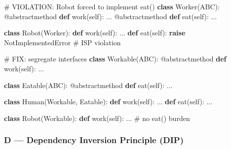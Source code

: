 \documentclass[11pt]{article}
\newenvironment{Shaded}{\begin{snugshade}}{\end{snugshade}}
\newcommand{\AttributeTok}[1]{\textcolor[rgb]{0.16,0.50,0.73}{#1}}
\newcommand{\CommentTok}[1]{\textcolor[rgb]{0.48,0.49,0.49}{#1}}
\newcommand{\ControlFlowTok}[1]{\textcolor[rgb]{0.99,0.74,0.29}{\textbf{#1}}}
\newcommand{\KeywordTok}[1]{\textcolor[rgb]{0.81,0.81,0.76}{\textbf{#1}}}
\newcommand{\NormalTok}[1]{\textcolor[rgb]{0.81,0.81,0.76}{#1}}
\newcommand{\PreprocessorTok}[1]{\textcolor[rgb]{0.15,0.68,0.38}{#1}}
\newcommand{\VariableTok}[1]{\textcolor[rgb]{0.15,0.68,0.68}{#1}}
\begin{document}
\begin{Shaded}
\begin{Highlighting}[]
\CommentTok{\# VIOLATION: Robot forced to implement eat()}
\KeywordTok{class}\NormalTok{ Worker(ABC):}
    \AttributeTok{@abstractmethod}
    \KeywordTok{def}\NormalTok{ work(}\VariableTok{self}\NormalTok{): ...}
    \AttributeTok{@abstractmethod}
    \KeywordTok{def}\NormalTok{ eat(}\VariableTok{self}\NormalTok{): ...}

\KeywordTok{class}\NormalTok{ Robot(Worker):}
    \KeywordTok{def}\NormalTok{ work(}\VariableTok{self}\NormalTok{): ...}
    \KeywordTok{def}\NormalTok{ eat(}\VariableTok{self}\NormalTok{): }\ControlFlowTok{raise} \PreprocessorTok{NotImplementedError}  \CommentTok{\# ISP violation}

\CommentTok{\# FIX: segregate interfaces}
\KeywordTok{class}\NormalTok{ Workable(ABC):}
    \AttributeTok{@abstractmethod}
    \KeywordTok{def}\NormalTok{ work(}\VariableTok{self}\NormalTok{): ...}

\KeywordTok{class}\NormalTok{ Eatable(ABC):}
    \AttributeTok{@abstractmethod}
    \KeywordTok{def}\NormalTok{ eat(}\VariableTok{self}\NormalTok{): ...}

\KeywordTok{class}\NormalTok{ Human(Workable, Eatable):}
    \KeywordTok{def}\NormalTok{ work(}\VariableTok{self}\NormalTok{): ...}
    \KeywordTok{def}\NormalTok{ eat(}\VariableTok{self}\NormalTok{): ...}

\KeywordTok{class}\NormalTok{ Robot(Workable):}
    \KeywordTok{def}\NormalTok{ work(}\VariableTok{self}\NormalTok{): ...  }\CommentTok{\# no eat() burden}
\end{Highlighting}
\end{Shaded}

\subsubsection{D --- Dependency Inversion Principle (DIP)}\label{d--dependency-inversion-principle-dip}

\end{document}
